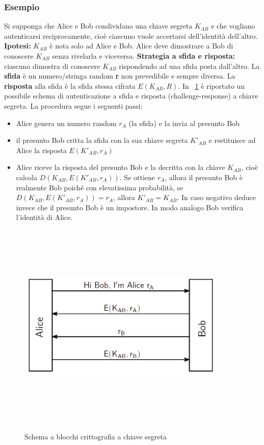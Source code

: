 \subsubsection{Esempio}
Si supponga che Alice e Bob condividano una chiave segreta $K_{AB}$ e che vogliano autenticarsi reciprocamente, cioè ciascuno vuole accertarsi dell'identità dell'altro. \newline \textbf{Ipotesi:} $K_{AB}$ è nota solo ad Alice e Bob. Alice deve dimostrare a Bob di conoscere $K_{AB}$ senza rivelarla e viceversa. \newline \textbf{Strategia a sfida e risposta:} ciascuno dimostra di conoscere $K_{AB}$ rispondendo ad una sfida posta dall'altro. La \textbf{sfida} è un numero/stringa random \textbf{r} non prevedibile e sempre diversa. La \textbf{risposta} alla sfida è la sfida stessa cifrata \textbf{$E(K_{AB},R)$}. In \figurename ~\ref{fig:strong_auth_sec} è riportato un possibile schema di autenticazione a sfida e risposta (challenge-response) a chiave segreta. La procedura segue i seguenti passi:
\begin{itemize}
  \item Alice genera un numero random $r_{A}$ (la sfida) e la invia al presunto Bob
  \item il presunto Bob critta la sfida con la sua chiave segreta $K'_{AB}$ e restituisce ad Alice la risposta $E(K'_{AB}, r_{A})$
  \item Alice riceve la risposta del presunto Bob e la decritta con la chiave $K_{AB}$, cioè calcola $D(K_{AB},E(K'_{AB}, r_{A}))$. Se ottiene $r_{A}$, allora il presunto Bob è realmente Bob poiché con elevatissima probabilità, se $D(K_{AB},E(K'_{AB}, r_{A})) = r_{A}$, allora $K'_{AB} = K_{AB}$. In caso negativo deduce invece che il presunto Bob è un impostore. In modo analogo Bob verifica l'identità di Alice.
\end{itemize}
\begin{figure}[htbp]
	\centering%
	\subfigure%
	{\includegraphics[height=10cm, width=10cm, keepaspectratio]{Immagini/chiave_segreta/strong_auth_secret.png}}
	\caption{Schema a blocchi crittografia a chiave segreta \label{fig:strong_auth_sec}} 	
\end{figure}
